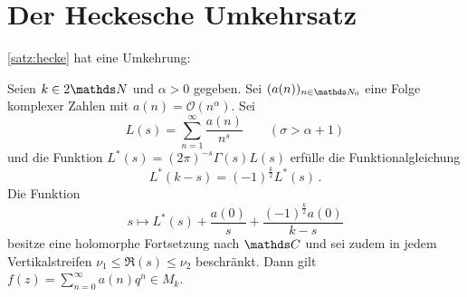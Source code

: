 \section{Der Heckesche Umkehrsatz}

\autoref{satz:hecke} hat eine Umkehrung:

\begin{satz}[Hecke]
	Seien $k \in 2\NN$ und $\alpha > 0$ gegeben.
	Sei $(a(n))_{n\in\NN_0}$ eine Folge komplexer Zahlen mit $a(n) = \mathcal{O}(n^\alpha)$.
	Sei
	\[
		L(s) = \sum_{n=1}^\infty \frac{a(n)}{n^s}
		\qquad (\sigma > \alpha +1)
	\]
	und die Funktion $L^*(s) = (2\pi)^{-s} \Gamma(s) L(s)$ erfülle die Funktionalgleichung
	\[
		L^*(k-s) = (-1)^{\frac{k}{2}}L^*(s)
		\,.
	\]
	Die Funktion 
	\[
	s \mapsto L^*(s) + \frac{a(0)}{s} + \frac{(-1)^{\frac{k}{2}} a(0)}{k-s}
	\]
	besitze eine holomorphe Fortsetzung nach $\CC$ und sei zudem in jedem Vertikalstreifen $\nu_1 \leq \Re(s) \leq \nu_2$ beschränkt. Dann gilt $f(z) = \sum_{n=0}^\infty a(n)q^n \in M_k$.
\end{satz}

